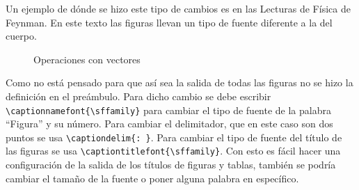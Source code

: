 Un ejemplo de dónde se hizo este tipo de cambios es en las Lecturas de Física
de Feynman. En este texto las figuras llevan un tipo de fuente diferente a la
del cuerpo.
\begin{figure}[h]
\centering
\begin{minipage}{0.4\linewidth}
\centering
{}

  \captionnamefont{\sffamily}
  \label{fig:vect1}
\end{minipage}
\hfill
\begin{minipage}{0.4\linewidth}
\centering
{}

  \captionnamefont{\sffamily}
  \label{fig:vect2}
\end{minipage}
  \captionnamefont{\sffamily}
  \caption{\sffamily Operaciones con vectores}
  \label{fig:vect}
\end{figure}

Como no está pensado para que así sea la salida de todas las figuras no se
hizo la definición en el preámbulo. Para dicho cambio se debe escribir
\verb|\captionnamefont{\sffamily}| para cambiar el tipo de fuente de la
palabra ``Figura'' y su número. Para cambiar el delimitador, que en este caso
son dos puntos se usa \verb|\captiondelim{: }|. Para cambiar el tipo de
fuente del título de las figuras se usa \verb|\captiontitlefont{\sffamily}|.
Con esto es fácil hacer una configuración de la salida de los títulos de
figuras y tablas, también se podría cambiar el tamaño de la fuente o poner
alguna palabra en específico.

